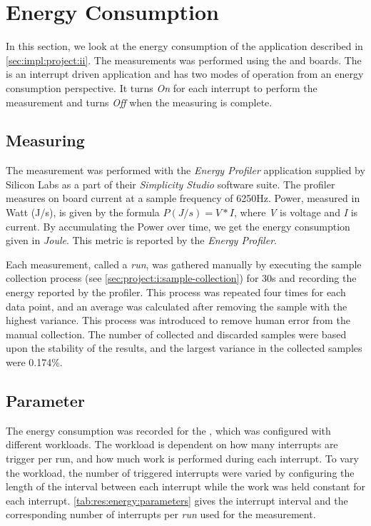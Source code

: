 \section{Energy Consumption}
\label{sec:res:energy}

In this section, we look at the energy consumption of the {\tracker} application described in \autoref{sec:impl:project:ii}.
The measurements was performed using the {\STK} and {\BIO} boards.
The {\tracker} is an interrupt driven application and has two modes of operation from an energy consumption perspective.
It turns \emph{On} for each interrupt to perform the measurement and turns \emph{Off} when the measuring is complete.

\subsection{Measuring}
The measurement was performed with the \emph{Energy Profiler} application supplied by Silicon Labs as a part of their \emph{Simplicity Studio} software suite.
The profiler measures on board current at a sample frequency of 6250Hz.
Power, measured in Watt (J/s), is given by the formula $P (J/s) = V*I $, where \emph{V} is voltage and \emph{I} is current.
By accumulating the Power over time, we get the energy consumption given in \emph{Joule}.
This metric is reported by the \emph{Energy Profiler}.

Each measurement, called a \emph{run}, was gathered manually by executing the sample collection process (see \autoref{sec:project:i:sample-collection}) for 30s and recording the energy reported by the profiler.
This process was repeated four times for each data point, and an average was calculated after removing the sample with the highest variance.
This process was introduced to remove human error from the manual collection.
The number of collected and discarded samples were based upon the stability of the results, and the largest variance in the collected samples were 0.174\%.

\subsection{Parameter}

The energy consumption was recorded for the {\tracker}, which was configured with different workloads.
The workload is dependent on how many interrupts are trigger per run, and how much work is performed during each interrupt.
To vary the workload, the number of triggered interrupts were varied by configuring the length of the interval between each interrupt while the work was held constant for each interrupt.
\autoref{tab:res:energy:parameters} gives the interrupt interval and the corresponding number of interrupts per \emph{run} used for the measurement.

